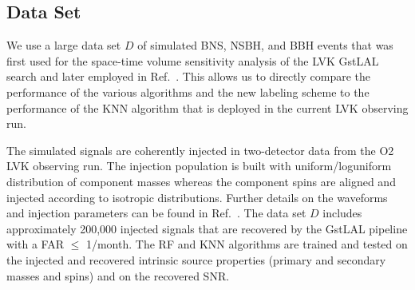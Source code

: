 \subsection{Data Set} \label{dataset}

We use a large data set $D$ of simulated \ac{BNS}, \ac{NSBH}, and \ac{BBH} events that was first used for the space-time volume sensitivity analysis of the \ac{LVK} GstLAL search
\cite{Sachdev:2019vvd,PhysRevD.95.042001,Sachdev:2020lfd} and later employed in Ref.~\cite{Chatterjee:2019avs}. This allows us to directly compare the performance of the various algorithms and the new
labeling scheme to the performance of the \ac{KNN} algorithm that is deployed in the current \ac{LVK} observing run. 

The simulated signals are coherently injected in two-detector data from the \ac{O2} \ac{LVK} observing run. The injection population is built with uniform/loguniform distribution of component masses whereas the component spins are aligned and injected according to isotropic distributions. Further details on the waveforms and injection parameters can be found in Ref.~\cite{Chatterjee:2019avs}. The data set $D$ includes approximately 200,000 injected signals that are recovered by the GstLAL pipeline with a \ac{FAR} $\le$ 1/month. The \ac{RF} and \ac{KNN} algorithms are trained and tested on the injected and recovered intrinsic source properties (primary and secondary masses and spins) and on the recovered \ac{SNR}. 

